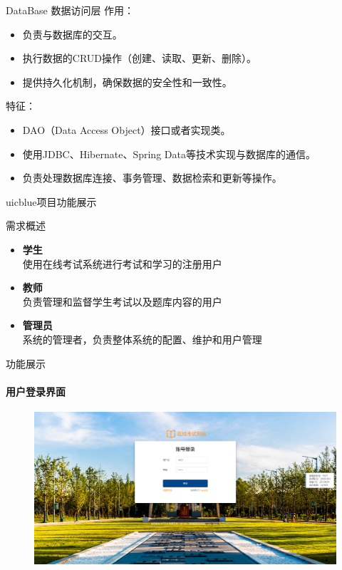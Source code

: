 \documentclass{beamer}
\begin{document}
\begin{frame}[fragile]{DataBase 数据访问层}
作用：
    \begin{itemize}
    \item 负责与数据库的交互。
    \item 执行数据的CRUD操作（创建、读取、更新、删除）。
    \item 提供持久化机制，确保数据的安全性和一致性。
    \end{itemize}
特征：
    \begin{itemize}
    \item DAO（Data Access Object）接口或者实现类。
    \item 使用JDBC、Hibernate、Spring Data等技术实现与数据库的通信。
    \item 负责处理数据库连接、事务管理、数据检索和更新等操作。
    \end{itemize}
\end{frame}

\begin{chapter}{uicblue}{项目功能展示}
\end{chapter}

\begin{frame}[fragile]{需求概述}
\begin{itemize}
    \item \textbf{学生}\\
    \qquad 使用在线考试系统进行考试和学习的注册用户
    \item \textbf{教师}\\
    \qquad 负责管理和监督学生考试以及题库内容的用户
    \item \textbf{管理员}\\
    \qquad 系统的管理者，负责整体系统的配置、维护和用户管理
\end{itemize}
\end{frame}


\begin{frame}[fragile]{功能展示}
\framesubtitle{用户登录界面}
\begin{figure}
    \centering
    \includegraphics[width=0.75\linewidth]{1.png}
\end{figure}
\end{frame}
\end{document}
